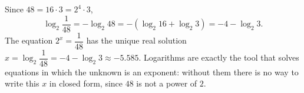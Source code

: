 Since $48=16\cdot3=2^4\cdot 3$,
\[
\log_2\dfrac{1}{48}=-\log_2 48=-\left(\log_2 16+\log_2 3\right)=\boxed{-4-\log_2 3}.
\]
The equation $2^x=\dfrac{1}{48}$ has the unique real solution $x=\log_2\dfrac{1}{48}=-4-\log_2 3\approx-5.585$. Logarithms are exactly the tool that solves equations in which the unknown is an exponent: without them there is no way to write this $x$ in closed form, since $48$ is not a power of $2$.
